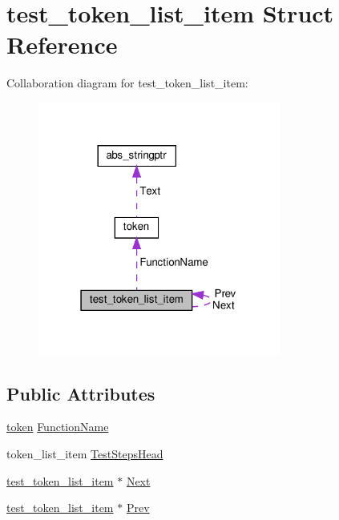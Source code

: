 \hypertarget{structtest__token__list__item}{}\section{test\+\_\+token\+\_\+list\+\_\+item Struct Reference}
\label{structtest__token__list__item}


Collaboration diagram for test\+\_\+token\+\_\+list\+\_\+item\+:\nopagebreak
\begin{figure}[H]
\begin{center}
\leavevmode
\includegraphics[width=226pt]{d0/d11/structtest__token__list__item__coll__graph}
\end{center}
\end{figure}
\subsection*{Public Attributes}
\begin{DoxyCompactItemize}
\item 
\hyperlink{structtoken}{token} \hyperlink{structtest__token__list__item_a48319a908d351d150a224fd1ece758d7}{Function\+Name}
\item 
token\+\_\+list\+\_\+item \hyperlink{structtest__token__list__item_a30e55573c651ec80614b75f9b180dc80}{Test\+Steps\+Head}
\item 
\hyperlink{structtest__token__list__item}{test\+\_\+token\+\_\+list\+\_\+item} $\ast$ \hyperlink{structtest__token__list__item_a271ea32ddd03b4f6bb44237881915692}{Next}
\item 
\hyperlink{structtest__token__list__item}{test\+\_\+token\+\_\+list\+\_\+item} $\ast$ \hyperlink{structtest__token__list__item_aa053b5098e750d72759f6520d287c74d}{Prev}
\end{DoxyCompactItemize}


